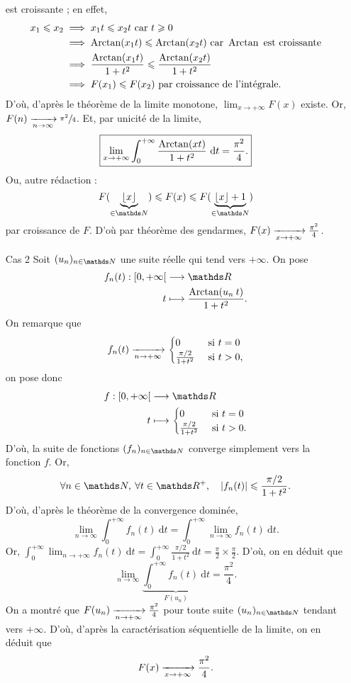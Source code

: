 \begin{exo}
\begin{itemize}
			est croissante ; en effet,
			\begin{align*}
				x_1 \leqslant x_2 &\implies x_1 t \leqslant x_2 t \text{ car } t \geqslant 0\\
				&\implies \operatorname{Arctan} (x_1 t) \leqslant \operatorname{Arctan}(x_2 t) \text{ car } \operatorname{Arctan} \text{ est croissante}\\
				&\implies \frac{\operatorname{Arctan}(x_1 t)}{1+t^2} \leqslant \frac{\operatorname{Arctan}(x_2 t)}{1+t^2}\\
				&\implies F(x_1) \leqslant F(x_2) \text{ par croissance de l'intégrale}.
			\end{align*}
			D'où, d'après le théorème de la limite monotone, $\lim_{x\to +\infty} F(x)$\/ existe. Or, $F(n) \xrightarrow[n\to \infty]{} \sfrac{\pi^2}{4}$. Et, par unicité de la limite, \[
				\boxed{\lim_{x\to +\infty} \int_{0}^{+\infty} \frac{\operatorname{Arctan}(xt)}{1+t^2}~\mathrm{d}t = \frac{\pi^2}{4}.}
			\] Ou, autre rédaction : \[F(\underbrace{\left\lfloor x \right\rfloor}_{\in \N}) \le F(x) \le F(\underbrace{\left\lfloor x \right\rfloor + 1}_{\in \N})\] par croissance de $F$. D'où par théorème des gendarmes, $F(x) \xrightarrow[x\to +\infty]{} \frac{\pi^2}{4}$.
		\item[\sc Cas 2] Soit $(u_n)_{n\in\N}$\/ une suite réelle qui tend vers $+\infty$. On pose \begin{align*}
			f_n(t): {[0, +\infty[} &\longrightarrow \R \\
			t &\longmapsto \frac{\Arctan(u_n\:t)}{1 + t^2}.
		\end{align*}
		On remarque que \[
			f_n(t) \xrightarrow[n\to +\infty]{} \begin{cases}
				0 & \text{ si } t = 0\\
				\frac{\pi / 2}{1 + t^2} & \text{ si } t > 0,\\
			\end{cases}
		\] on pose donc \begin{align*}
			f: {[0,+\infty[} &\longrightarrow \R \\
			t &\longmapsto \begin{cases}
				0&\text{ si } t = 0\\
				\frac{\pi / 2}{1 + t^2} & \text{ si } t > 0.
			\end{cases}
		\end{align*}
		D'où, la suite de fonctions $(f_n)_{n\in\N}$\/ converge simplement vers la fonction $f$.
		Or, \[
			\forall n \in \N,\: \forall t \in \R^+,\quad|f_n(t)| \le \frac{\pi / 2}{1 + t^2}
		.\] D'où, d'après le théorème de la convergence dominée, \[
			\lim_{n\to \infty} \int_{0}^{+\infty} f_n(t)~\mathrm{d}t = \int_{0}^{+\infty} \lim_{n\to \infty} f_n(t)~\mathrm{d}t
		.\] Or, $\int_{0}^{+\infty} \lim_{n\to +\infty}f_n(t)~\mathrm{d}t = \int_{0}^{+\infty} \frac{\pi / 2}{1+t^2}~\mathrm{d}t = \frac{\pi}{2} \times \frac{\pi}{2}$. D'où, on en déduit que \[
			\lim_{n\to \infty} \underbrace{\int_{0}^{+\infty} f_n(t)~\mathrm{d}t}_{F(u_n)} = \frac{\pi^2}{4}
		.\]
		On a montré que $F(u_n) \xrightarrow[n\to +\infty]{} \frac{\pi^2}{4}$\/ pour toute suite $(u_n)_{n\in\N}$\/ tendant vers $+\infty$. D'où, d'après la caractérisation séquentielle de la limite, on en déduit que \[
			F(x) \xrightarrow[x\to +\infty]{} \frac{\pi^2}{4}
		.\]
	\end{itemize}
\end{exo}

